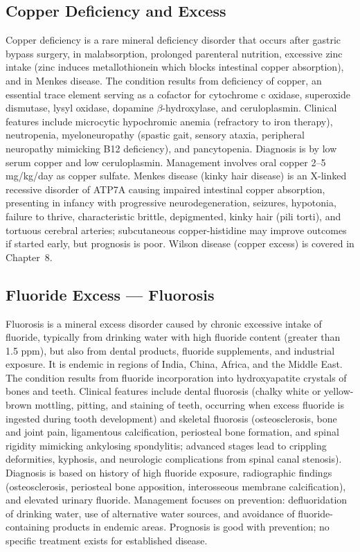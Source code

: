 \subsection{Copper Deficiency and Excess}
\label{sec:Copper Disorders}
Copper deficiency is a rare mineral deficiency disorder that occurs after gastric bypass surgery, in malabsorption, prolonged parenteral nutrition, excessive zinc intake (zinc induces metallothionein which blocks intestinal copper absorption), and in Menkes disease. The condition results from deficiency of copper, an essential trace element serving as a cofactor for cytochrome c oxidase, superoxide dismutase, lysyl oxidase, dopamine $\beta$-hydroxylase, and ceruloplasmin. Clinical features include microcytic hypochromic anemia (refractory to iron therapy), neutropenia, myeloneuropathy (spastic gait, sensory ataxia, peripheral neuropathy mimicking B12 deficiency), and pancytopenia. Diagnosis is by low serum copper and low ceruloplasmin. Management involves oral copper 2--5 mg/kg/day as copper sulfate. Menkes disease (kinky hair disease) is an X-linked recessive disorder of ATP7A causing impaired intestinal copper absorption, presenting in infancy with progressive neurodegeneration, seizures, hypotonia, failure to thrive, characteristic brittle, depigmented, kinky hair (pili torti), and tortuous cerebral arteries; subcutaneous copper-histidine may improve outcomes if started early, but prognosis is poor. Wilson disease (copper excess) is covered in Chapter~8.

\subsection{Fluoride Excess --- Fluorosis}
\label{sec:Fluorosis}
Fluorosis is a mineral excess disorder caused by chronic excessive intake of fluoride, typically from drinking water with high fluoride content (greater than 1.5 ppm), but also from dental products, fluoride supplements, and industrial exposure. It is endemic in regions of India, China, Africa, and the Middle East. The condition results from fluoride incorporation into hydroxyapatite crystals of bones and teeth. Clinical features include dental fluorosis (chalky white or yellow-brown mottling, pitting, and staining of teeth, occurring when excess fluoride is ingested during tooth development) and skeletal fluorosis (osteosclerosis, bone and joint pain, ligamentous calcification, periosteal bone formation, and spinal rigidity mimicking ankylosing spondylitis; advanced stages lead to crippling deformities, kyphosis, and neurologic complications from spinal canal stenosis). Diagnosis is based on history of high fluoride exposure, radiographic findings (osteosclerosis, periosteal bone apposition, interosseous membrane calcification), and elevated urinary fluoride. Management focuses on prevention: defluoridation of drinking water, use of alternative water sources, and avoidance of fluoride-containing products in endemic areas. Prognosis is good with prevention; no specific treatment exists for established disease.

